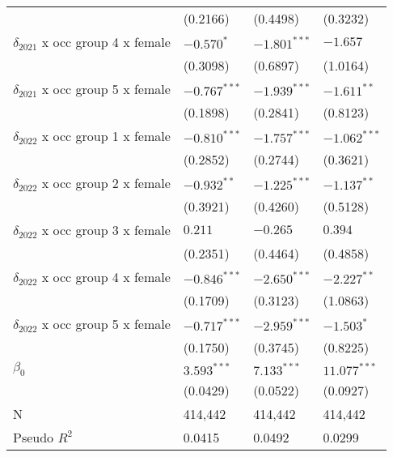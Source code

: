 \begin{tabular}{llll}
                                       &           (0.2166) &           (0.4498) &           (0.3232) \\
$\delta_{2021}$ x occ group 4 x female &         $-0.570^*$ &     $-1.801^{***}$ &           $-1.657$ \\
                                       &           (0.3098) &           (0.6897) &           (1.0164) \\
$\delta_{2021}$ x occ group 5 x female &     $-0.767^{***}$ &     $-1.939^{***}$ &      $-1.611^{**}$ \\
                                       &           (0.1898) &           (0.2841) &           (0.8123) \\
$\delta_{2022}$ x occ group 1 x female &     $-0.810^{***}$ &     $-1.757^{***}$ &     $-1.062^{***}$ \\
                                       &           (0.2852) &           (0.2744) &           (0.3621) \\
$\delta_{2022}$ x occ group 2 x female &      $-0.932^{**}$ &     $-1.225^{***}$ &      $-1.137^{**}$ \\
                                       &           (0.3921) &           (0.4260) &           (0.5128) \\
$\delta_{2022}$ x occ group 3 x female &            $0.211$ &           $-0.265$ &            $0.394$ \\
                                       &           (0.2351) &           (0.4464) &           (0.4858) \\
$\delta_{2022}$ x occ group 4 x female &     $-0.846^{***}$ &     $-2.650^{***}$ &      $-2.227^{**}$ \\
                                       &           (0.1709) &           (0.3123) &           (1.0863) \\
$\delta_{2022}$ x occ group 5 x female &     $-0.717^{***}$ &     $-2.959^{***}$ &         $-1.503^*$ \\
                                       &           (0.1750) &           (0.3745) &           (0.8225) \\
$\beta_0$                              &      $3.593^{***}$ &      $7.133^{***}$ &     $11.077^{***}$ \\
                                       &           (0.0429) &           (0.0522) &           (0.0927) \\
N                                      &            414,442 &            414,442 &            414,442 \\
Pseudo $R^2$                           &             0.0415 &             0.0492 &             0.0299 \\
\bottomrule
\end{tabular}

